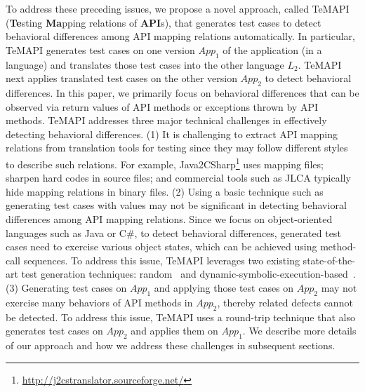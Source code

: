 %

To address these preceding issues, we propose a novel approach, called TeMAPI (\textbf{Te}sting \textbf{Ma}pping relations of \textbf{API}s), that generates test cases to detect behavioral differences among API mapping relations automatically. In particular, TeMAPI generates test cases on one version $App_1$ of the application (in a language) and translates those test cases into the other language $L_2$. TeMAPI next applies translated test cases on the other version $App_2$ to detect behavioral differences. In this paper, we primarily focus on behavioral differences that can be observed via return values of API methods or exceptions thrown by API methods. TeMAPI addresses three major technical challenges in effectively detecting behavioral differences. (1) It is challenging to extract API mapping relations from translation tools for testing since they may follow different styles to describe such relations. For example, Java2CSharp\footnote{\url{http://j2cstranslator.sourceforge.net/}} uses mapping files; sharpen hard codes in source files; and commercial tools such as JLCA typically hide mapping relations in binary files. (2) Using a basic technique such as generating test cases with  values may not be significant in detecting behavioral differences among API mapping relations. Since we focus on object-oriented languages such as Java or C\#, to detect behavioral differences, generated test cases need to exercise various object states, which can be achieved using method-call sequences. To address this issue, TeMAPI leverages two existing state-of-the-art test generation techniques: random~\cite{pacheco2007feedback} and dynamic-symbolic-execution-based~\cite{koushik:cute, godefroid:dart, tillmann2008pex}. (3) Generating test cases on $App_1$ and applying those test cases on $App_2$ may not exercise many behaviors of API methods in $App_2$, thereby related defects cannot be detected. To address this issue, TeMAPI uses a round-trip technique that also generates test cases on $App_2$ and applies them on $App_1$. We describe more details of our approach and how we address these challenges in subsequent sections.

